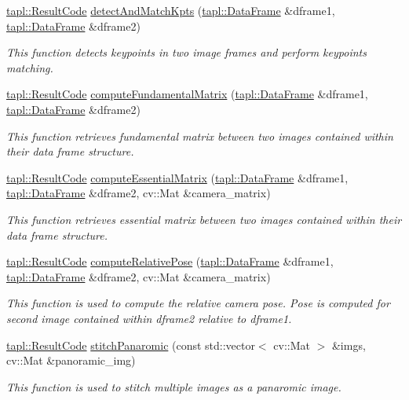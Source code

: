 \begin{DoxyCompactItemize}
\hyperlink{namespacetapl_a196ce1d5bf399fc26f03797e6a8d03ff}{tapl\+::\+Result\+Code} \hyperlink{namespacetapl_1_1cve_a34cb000d47a121549e81900da9913299}{detect\+And\+Match\+Kpts} (\hyperlink{structtapl_1_1DataFrame}{tapl\+::\+Data\+Frame} \&dframe1, \hyperlink{structtapl_1_1DataFrame}{tapl\+::\+Data\+Frame} \&dframe2)
\begin{DoxyCompactList}\small\item\em This function detects keypoints in two image frames and perform keypoints matching. \end{DoxyCompactList}\item 
\hyperlink{namespacetapl_a196ce1d5bf399fc26f03797e6a8d03ff}{tapl\+::\+Result\+Code} \hyperlink{namespacetapl_1_1cve_a8e1c9ef8d5eae6975b5e7e7c360fc1e8}{compute\+Fundamental\+Matrix} (\hyperlink{structtapl_1_1DataFrame}{tapl\+::\+Data\+Frame} \&dframe1, \hyperlink{structtapl_1_1DataFrame}{tapl\+::\+Data\+Frame} \&dframe2)
\begin{DoxyCompactList}\small\item\em This function retrieves fundamental matrix between two images contained within their data frame structure. \end{DoxyCompactList}\item 
\hyperlink{namespacetapl_a196ce1d5bf399fc26f03797e6a8d03ff}{tapl\+::\+Result\+Code} \hyperlink{namespacetapl_1_1cve_a30da40f2aa0e434425c7b14f23b59457}{compute\+Essential\+Matrix} (\hyperlink{structtapl_1_1DataFrame}{tapl\+::\+Data\+Frame} \&dframe1, \hyperlink{structtapl_1_1DataFrame}{tapl\+::\+Data\+Frame} \&dframe2, cv\+::\+Mat \&camera\+\_\+matrix)
\begin{DoxyCompactList}\small\item\em This function retrieves essential matrix between two images contained within their data frame structure. \end{DoxyCompactList}\item 
\hyperlink{namespacetapl_a196ce1d5bf399fc26f03797e6a8d03ff}{tapl\+::\+Result\+Code} \hyperlink{namespacetapl_1_1cve_ad8314ef8898d3a90c6d93a514bf75d20}{compute\+Relative\+Pose} (\hyperlink{structtapl_1_1DataFrame}{tapl\+::\+Data\+Frame} \&dframe1, \hyperlink{structtapl_1_1DataFrame}{tapl\+::\+Data\+Frame} \&dframe2, cv\+::\+Mat \&camera\+\_\+matrix)
\begin{DoxyCompactList}\small\item\em This function is used to compute the relative camera pose. Pose is computed for second image contained within dframe2 relative to dframe1. \end{DoxyCompactList}\item 
\hyperlink{namespacetapl_a196ce1d5bf399fc26f03797e6a8d03ff}{tapl\+::\+Result\+Code} \hyperlink{namespacetapl_1_1cve_aab4041f410589ff960febecf36b3ee2b}{stitch\+Panaromic} (const std\+::vector$<$ cv\+::\+Mat $>$ \&imgs, cv\+::\+Mat \&panoramic\+\_\+img)
\begin{DoxyCompactList}\small\item\em This function is used to stitch multiple images as a panaromic image. \end{DoxyCompactList}\end{DoxyCompactItemize}


